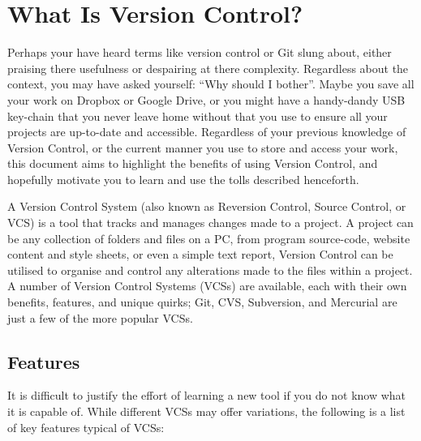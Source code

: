 \documentclass[11pt, a4paper, titlepage]{article}
\begin{document}
\tableofcontents 
\pagebreak



\section{What Is Version Control?}
Perhaps your have heard terms like version control or Git slung about, either
praising there usefulness or despairing at there complexity. 
Regardless about the context, you may have asked yourself: 
``Why should I bother''.
Maybe you save all your work on Dropbox or Google Drive, or you might have a
handy-dandy USB key-chain that you never leave home without that you use to
ensure all your projects are up-to-date and accessible.
Regardless of your previous knowledge of Version Control, or the current
manner you use to store and access your work, this document aims to highlight
the benefits of using Version Control, and hopefully motivate you to learn and
use the tolls described henceforth.

A Version Control System (also known as Reversion Control, Source Control, or
VCS) is a tool that tracks and manages changes made to a project.  
A project can be any collection of folders and files on a PC, from program
source-code, website content and style sheets, or even a simple text report,
Version Control can be utilised to organise and control any alterations made
to the files within a project. 
A number of Version Control Systems (VCSs) are available, each with their own
benefits, features, and unique quirks; Git, CVS, Subversion, and Mercurial are
just a few of the more popular VCSs.


\subsection{Features}
It is difficult to justify the effort of learning a new tool if you do not
know what it is capable of.
While different VCSs may offer variations, the following is a list of key
features typical of VCSs:
\end{document}
